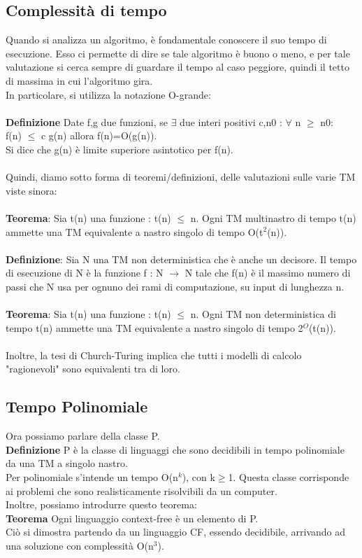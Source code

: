 \documentclass[]{article}
\begin{document}
		\subsection{Complessità di tempo}
			Quando si analizza un algoritmo, è fondamentale conoscere il suo tempo di esecuzione. Esso ci permette di dire se tale algoritmo è buono o meno, e per tale valutazione si cerca sempre di guardare il tempo al caso peggiore, quindi il tetto di massima in cui l'algoritmo gira.\\
			In particolare, si utilizza la notazione O-grande:\\\\
			\textbf{Definizione} Date f,g due funzioni, se $\exists$ due interi positivi c,n0 : $\forall$ n $\geq$ n0:\\ f(n) $\leq$ c g(n) allora f(n)=O(g(n)).\\ Si dice che g(n) è limite superiore asintotico per f(n).\\\\
			Quindi, diamo sotto forma di teoremi/definizioni, delle valutazioni sulle varie TM viste sinora:\\\\
			\textbf{Teorema}: Sia t(n) una funzione : t(n) $\leq$ n. Ogni TM multinastro di tempo t(n) ammette una TM equivalente a nastro singolo di tempo O(t$^2$(n)).\\\\
			\textbf{Definizione}: Sia N una TM non deterministica che è anche un decisore. Il tempo di esecuzione di N è la funzione f : N $\rightarrow$ N tale che f(n) è il massimo numero di passi che N usa per ognuno dei rami di computazione, su input di lunghezza n.\\\\
			\textbf{Teorema}: Sia t(n) una funzione : t(n) $\leq$ n. Ogni TM non deterministica di tempo t(n) ammette una TM equivalente a nastro singolo di tempo 2$^O$(t(n)).\\\\
			Inoltre, la tesi di Church-Turing implica che tutti i modelli di calcolo "ragionevoli" sono equivalenti tra di loro.
		\subsection{Tempo Polinomiale}
			Ora possiamo parlare della classe P.\\
			\textbf{Definizione} P è la classe di linguaggi che sono decidibili in tempo polinomiale da una TM a singolo nastro.\\
			Per polinomiale s'intende un tempo O(n$^k$), con k$\geq$1. Questa classe corrisponde ai problemi che sono realisticamente risolvibili da un computer.\\
			Inoltre, possiamo introdurre questo teorema:\\
			\textbf{Teorema} Ogni linguaggio context-free è un elemento di P.\\
			Ciò si dimostra partendo da un linguaggio CF, essendo decidibile, arrivando ad una soluzione con complessità O(n$^3$).
\end{document}
